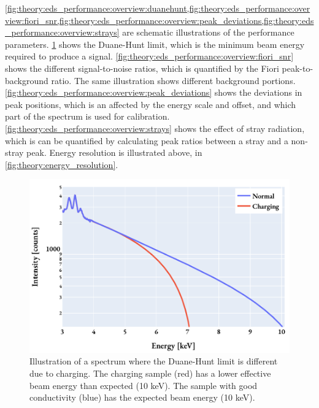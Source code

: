 \cref{fig:theory:eds_performance:overview:duanehunt,fig:theory:eds_performance:overview:fiori_snr,fig:theory:eds_performance:overview:peak_deviations,fig:theory:eds_performance:overview:strays} are schematic illustrations of the performance parameters.
\cref{fig:theory:eds_performance:overview:duanehunt} shows the Duane-Hunt limit, which is the minimum beam energy required to produce a signal.
\cref{fig:theory:eds_performance:overview:fiori_snr} shows the different signal-to-noise ratios, which is quantified by the Fiori peak-to-background ratio.
The same illustration shows different background portions.
\cref{fig:theory:eds_performance:overview:peak_deviations} shows the deviations in peak positions, which is an affected by the energy scale and offset, and which part of the spectrum is used for calibration.
\cref{fig:theory:eds_performance:overview:strays} shows the effect of stray radiation, which is can be quantified by calculating peak ratios between a stray and a non-stray peak.
Energy resolution is illustrated above, in \cref{fig:theory:energy_resolution}.


\begin{figure}[htp]
    \centering
    \includegraphics[width=0.6\linewidth]{figures/pp_duane-hunt.pdf}
    \caption{
        Illustration of a spectrum where the Duane-Hunt limit is different due to charging.
        The charging sample (red) has a lower effective beam energy than expected (10 keV).
        The sample with good conductivity (blue) has the expected beam energy (10 keV).
    }
    \label{fig:theory:eds_performance:overview:duanehunt}
\end{figure}


